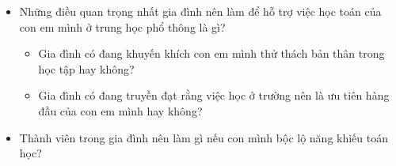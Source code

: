 {{\begin{itemize}
\begin{itemize}
            \item Gia đình có đang nhấn mạnh tầm quan trọng của sự bền bỉ, ngay cả khi con em mình nản lòng, hay không?
          \end{itemize}

        \item Những điều quan trọng nhất gia đình nên làm để hỗ trợ việc học toán của con em mình ở trung học phổ thông là gì?
          \begin{itemize}
            \item Gia đình có đang khuyến khích con em mình thử thách bản thân trong học tập hay không?

            \item Gia đình có đang truyền đạt rằng việc học ở trường nên là ưu tiên hàng đầu của con em mình hay không?
          \end{itemize}

        \item Thành viên trong gia đình nên làm gì nếu con mình bộc lộ năng khiếu toán học?
      \end{itemize}}
  }
